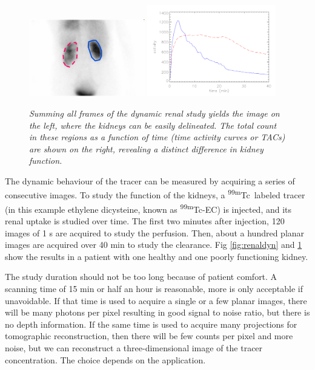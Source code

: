 \documentclass[11pt,oneside]{article}
\begin{document}
\begin{figure}[tb]
\centering
\includegraphics[width=0.45\textwidth]{figs/fig_renalrois.pdf}
  \includegraphics[width=0.5\textwidth]{figs/fig_renalplot.pdf}
\caption{\label{fig:renalroi} \emph{Summing all frames of the dynamic
    renal study yields the image on the left, where the kidneys can be
    easily delineated. The total count in these regions as a function
    of time (time activity curves or TACs) are shown on the right,
    revealing a distinct difference in kidney function.}}
\end{figure}

The dynamic behaviour of the tracer can be measured by acquiring a
series of consecutive images. To study the function of the kidneys, a
\textsuperscript{99m}Tc\ labeled tracer (in this example ethylene dicysteine, known
as \textsuperscript{99m}Tc-EC) is injected, and its renal uptake is studied over
time. The first two minutes after injection, 120 images of 1 s are
acquired to study the perfusion. Then, about a hundred planar images
are acquired over 40 min to study the clearance. Fig
\ref{fig:renaldyn} and \ref{fig:renalroi} show the results in a
patient with one healthy and one poorly functioning kidney.

The study duration should not be too long because of patient
comfort. A scanning time of 15 min or half an hour is reasonable, more
is only acceptable if unavoidable. If that time is used to acquire a
single or a few planar images, there will be many photons per pixel
resulting in good signal to noise ratio, but there is no depth
information.  If the same time is used to acquire many projections for
tomographic reconstruction, then there will be few counts per pixel
and more noise, but we can reconstruct a three-dimensional image of
the tracer concentration. The choice depends on the application.
\end{document}
